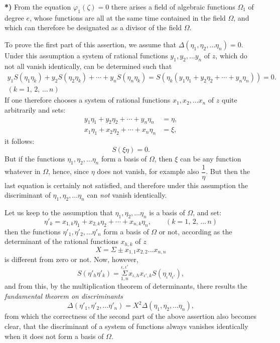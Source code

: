 \documentclass{article}
\begin{document}
\textbf{*)} From the equation $\varphi_{1}(\zeta) = 0$ there arises a field of algebraic functions $\Omega_{1}$ of degree $e$, whose functions are all at the same time contained in the field $\Omega$, and which can therefore be designated as a divisor of the field $\Omega$.


To prove the first part of this assertion, we assume that $\Delta(\eta_{1}, \eta_{2}, \ldots \eta_{n}) = 0$. Under this assumption a system of rational functions $y_{1}, y_{2}, \ldots y_{n}$ of $z$, which do not all vanish identically, can be determined such that
\[ \begin{gathered} y_{1}S(\eta_{1}\eta_{k}) + y_{2}S(\eta_{2}\eta_{k}) + \cdots + y_{n}S(\eta_{n}\eta_{k}) = S(\eta_{k}(y_{1}\eta_{1} + y_{2}\eta_{2} + \cdots + y_{n}\eta_{n})) = 0. \\ {\scriptstyle (k = 1,\, 2,\, \ldots\, n)} \end{gathered} \]
If one therefore chooses a system of rational functions $x_{1}, x_{2}, \ldots x_{n}$ of $z$ quite arbitrarily and sets:
\[ \begin{aligned} y_{1}\eta_{1} + y_{2}\eta_{2} + \cdots + y_{n}\eta_{n} &= \eta, \\ x_{1}\eta_{1} + x_{2}\eta_{2} + \cdots + x_{n}\eta_{n} &= \xi, \end{aligned} \]
it follows:
\[ S(\xi\eta) = 0. \]
But if the functions $\eta_{1}, \eta_{2}, \ldots \eta_{n}$ form a basis of $\Omega$, then $\xi$ can be any function whatever in $\Omega$, hence, since $\eta$ does not vanish, for example also $\dfrac{1}{\eta}$. But then the last equation is certainly not satisfied, and therefore under this assumption the discriminant of $\eta_{1}, \eta_{2}, \ldots \eta_{n}$ can \emph{not} vanish identically.

Let us keep to the assumption that $\eta_{1}, \eta_{2}, \ldots \eta_{n}$ is a basis of $\Omega$, and set:
\[ \eta'_{k} = x_{1,k}\eta_{1} + x_{2,k}\eta_{2} + \cdots + x_{n,k}\eta_{n}, \qquad {\scriptstyle (k = 1,\, 2,\, \ldots\, n)} \]
then the functions $\eta'_{1}, \eta'_{2}, \ldots \eta'_{n}$ form a basis of $\Omega$ or not, according as the determinant of the rational functions $x_{h,k}$ of $z$
\[ X = \Sigma \pm x_{1,1}x_{2,2} \ldots x_{n,n} \]
is different from zero or not. Now, however,
\[ S(\eta'_{h}\eta'_{k}) = \overset{\iota,\iota'}{\underset{1,n}{\Sigma}} x_{\iota,h}x_{\iota',k}S(\eta_{\iota}\eta_{\iota'}), \]
and from this, by the multiplication theorem of determinants, there results the \emph{fundamental theorem on discriminants}
\[ \Delta(\eta'_{1}, \eta'_{2}, \ldots \eta'_{n}) = X^{2}\Delta(\eta_{1}, \eta_{2}, \ldots \eta_{n}), \tag{13.} \]
from which the correctness of the second part of the above assertion also becomes clear, that the discriminant of a system of functions always vanishes identically when it does not form a basis of $\Omega$.
\end{document}
